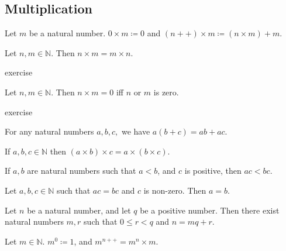 \documentclass{article}
\begin{document}
\subsection{Multiplication}
\begin{definition}
	Let \(m\) be a natural number. \(0\times m\coloneq 0\) and \((n++)\times m\coloneq (n\times m)+m\).
\end{definition}
\begin{lemma}
	Let \(n,m\in\mathbb{N}\). Then \(n\times m=m\times n\).
	\begin{IEEEproof}
		exercise
	\end{IEEEproof}
\end{lemma}
\begin{lemma}
	Let \(n,m\in\mathbb{N}\). Then \(n\times m=0\) iff \(n\) or \(m\) is zero.
	\begin{IEEEproof}
		exercise
	\end{IEEEproof}
\end{lemma}
\begin{proposition}
	For any natural numbers \(a,b,c,\) we have \(a(b+c)=ab+ac\).
\end{proposition}
\begin{proposition}
	If \(a,b,c\in\mathbb{N}\) then \((a\times b)\times c=a\times(b\times c)\).
\end{proposition}
\begin{proposition}
	If \(a,b\) are natural numbers such that \(a<b\), and \(c\) is positive, then \(ac<bc\).
\end{proposition}
\begin{corollary}
	Let \(a,b,c\in\mathbb{N}\) such that \(ac=bc\) and \(c\) is non-zero. Then \(a=b\).
\end{corollary}
\begin{proposition}
	Let \(n\) be a natural number, and let \(q\) be a positive number. Then there exist natural numbers \(m,r\) such that \(0\leq r<q\) and \(n=mq+r\).
\end{proposition}
\begin{definition}
	Let \(m\in\mathbb{N}\). \(m^0\coloneq 1\), and \(m^{n++}=m^n\times m\).
\end{definition}
\end{document}
